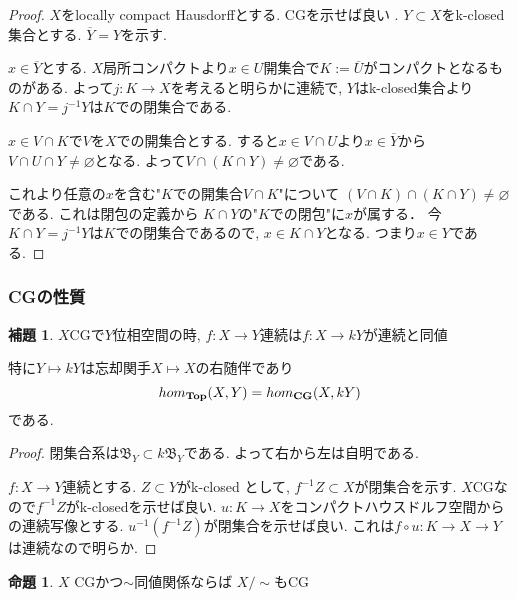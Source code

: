 \documentclass[dvipdfmx,a4paper,11pt]{article}
\theoremstyle{definition}
\newtheorem{lem}[thm]{補題}
\newtheorem{prop}[thm]{命題}
\begin{document}
\begin{proof}
 $X$をlocally compact Hausdorffとする.
CGを示せば良い .
$Y \subset X$をk-closed集合とする.
$\overline{Y} = Y$を示す.

$x \in \overline{Y}$とする.
$X$局所コンパクトより$x \in U$開集合で$K:= \overline{U}$がコンパクトとなるものがある.
よって$j : K \to X$を考えると明らかに連続で, $Y$はk-closed集合より$K\cap Y = j^{-1}Y$は$K$での閉集合である.

$x \in V \cap K$で$V$を$X$での開集合とする.
すると$x \in V \cap U$より$x \in \overline{Y}$から
$V \cap U \cap Y \neq\varnothing$となる.
よって$V \cap (K \cap Y)\neq\varnothing$である.

これより任意の$x$を含む"$K$での開集合$V \cap K$"について
$(V \cap K) \cap  (K \cap Y) \neq \varnothing$である.
これは閉包の定義から
$K \cap Y$の"$K$での閉包"に$x$が属する．
今$K\cap Y = j^{-1}Y$は$K$での閉集合であるので, $x \in K \cap Y$となる. 
つまり$x \in Y$である. 
\end{proof}


\subsubsection{CGの性質}


 \begin{tcolorbox}
 [colback = white, colframe = green!35!black, fonttitle = \bfseries,breakable = true]
\begin{lem}\cite[Cor1.10]{Str}
\label{Str-cor1.10}
$X$CGで$Y$位相空間の時, 
$f : X \to Y$連続は$f : X \to kY$が連続と同値

特に$Y \mapsto kY$は忘却関手$X \mapsto X$の右随伴であり
$$
hom_{{\bf Top}}(X, Y) = hom_{{\bf CG}}(X, kY)
$$
である. 
\end{lem}
\end{tcolorbox}

\begin{proof}
閉集合系は$\mathfrak{B}_Y \subset k\mathfrak{B}_Y$である.
よって右から左は自明である.

$f : X \to Y$連続とする. $Z \subset Y$がk-closed として, $f^{-1}Z \subset X$が閉集合を示す.
$X$CGなので$f^{-1}Z$がk-closedを示せば良い.
$u : K \to X$をコンパクトハウスドルフ空間からの連続写像とする.
$u^{-1}(f^{-1}Z )$が閉集合を示せば良い. これは$f \circ u : K \to X \to Y$は連続なので明らか.
\end{proof}




 \begin{tcolorbox}
 [colback = white, colframe = green!35!black, fonttitle = \bfseries,breakable = true]
\begin{prop}\cite[Prop2.1]{Str}
\label{Str-prop2.1}
$X$ CGかつ$\sim$同値関係ならば
$X/\sim$もCG
\end{prop}
\end{tcolorbox}
\end{document}
